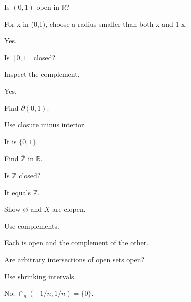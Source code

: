 \begin{exercise}\label{exr:ii04-01}
Is $(0,1)$ open in $\mathbb R$?
\end{exercise}
\begin{hint}
For x in (0,1), choose a radius smaller than both x and 1-x.
\end{hint}
\begin{solution}
Yes.
\end{solution}

\begin{exercise}\label{exr:ii04-02}
Is $[0,1]$ closed?
\end{exercise}
\begin{hint}
Inspect the complement.
\end{hint}
\begin{solution}
Yes.
\end{solution}

\begin{exercise}\label{exr:ii04-03}
Find $\partial(0,1)$.
\end{exercise}
\begin{hint}
Use closure minus interior.
\end{hint}
\begin{solution}
It is $\{0,1\}$.
\end{solution}

\begin{exercise}\label{exr:ii04-04}
Find $\overline{\mathbb Z}$ in $\mathbb R$.
\end{exercise}
\begin{hint}
Is $\mathbb Z$ closed?
\end{hint}
\begin{solution}
It equals $\mathbb Z$.
\end{solution}

\begin{exercise}\label{exr:ii04-05}
Show $\varnothing$ and $X$ are clopen.
\end{exercise}
\begin{hint}
Use complements.
\end{hint}
\begin{solution}
Each is open and the complement of the other.
\end{solution}

\begin{exercise}\label{exr:ii04-06}
Are arbitrary intersections of open sets open?
\end{exercise}
\begin{hint}
Use shrinking intervals.
\end{hint}
\begin{solution}
No; $\cap_n(-1/n,1/n)=\{0\}$.
\end{solution}


